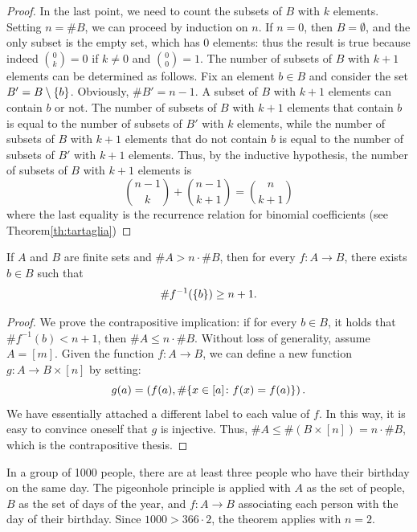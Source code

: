 \begin{proof}
In the last point, we need to count the subsets of $B$ with $k$ elements.
Setting $n=\#B$, we can proceed by induction on $n$.
If $n=0$, then $B=\emptyset$, and the only subset 
is the empty set, which has $0$ elements: thus
the result is true because indeed $\binom{0}{k} = 0$ if $k\neq 0$ and
$\binom{0}{0}=1$.
The number of subsets of $B$ with $k+1$ elements 
can be determined as follows.
Fix an element $b\in B$ and consider the set 
$B'=B\setminus {\left\{ b \right\}}$. Obviously, $\#B' = n-1$.
A subset of $B$ with $k+1$ elements can contain $b$ 
or not. 
The number of subsets of $B$ with $k+1$ elements that contain $b$
is equal to the number of subsets of $B'$ with $k$ elements,
while the number of subsets of $B$ with $k+1$ elements that do not contain $b$
is equal to the number of subsets of $B'$ with $k+1$ elements.
Thus, by the inductive hypothesis, the number of subsets of $B$ with $k+1$
elements is
\[
  \binom{n-1}{k} + \binom{n-1}{k+1} = \binom{n}{k+1}
\]
where the last equality is the recurrence relation for binomial coefficients
(see Theorem\ref{th:tartaglia})
\end{proof}

\begin{theorem}
If $A$ and $B$ are finite sets and $\#A > n\cdot \#B$, then 
for every $f\colon A \to B$, there exists $b\in B$ such that 
\[
 \# f^{-1}({\left\{ b \right\}}) \ge n+1.
\]
\end{theorem}
\begin{proof}
We prove the contrapositive implication: if for every $b\in B$, it holds that
$\# f^{-1}(b) < n+1$,
then $\#A \le n\cdot \#B$.
Without loss of generality, assume $A=[m]$.
Given the function $f\colon A\to B$, we can define a new function $g\colon A\to
B\times[n]$
by setting:
\[
  g(a) = \left(f(a),\# {\left\{ x\in [a]\colon f(x)=f(a) \right\}}\right).
\]
We have essentially attached a different label to each value of $f$. 
In this way, it is easy to convince oneself that $g$ is injective.
Thus, $\#A \le \#(B\times [n]) = n\cdot \# B$, which is the contrapositive
thesis.
\end{proof}

\begin{example}
In a group of 1000 people, there are at least three people who have their
birthday on the same day.
The pigeonhole principle is applied with $A$ as the set of people, 
$B$ as the set of days of the year, and $f\colon A\to B$ associating each person
with the day
of their birthday. Since $1000 > 366 \cdot 2$, the theorem applies with $n=2$.
\end{example}
